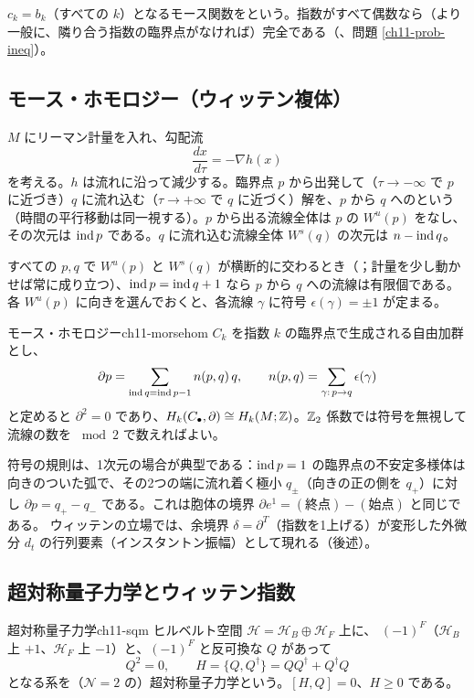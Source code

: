 $c_k=b_k$（すべての $k$）となるモース関数をという。指数がすべて偶数なら（より一般に、隣り合う指数の臨界点がなければ）完全である（、問題 \ref{ch11-prob-ineq}）。

\subsection{モース・ホモロジー（ウィッテン複体）}
$M$ にリーマン計量を入れ、勾配流
\[
\frac{dx}{d\tau}=-\nabla h(x)
\]
を考える。$h$ は流れに沿って減少する。臨界点 $p$ から出発して（$\tau\to-\infty$ で $p$ に近づき）$q$ に流れ込む（$\tau\to+\infty$ で $q$ に近づく）解を、$p$ から $q$ へのという（時間の平行移動は同一視する）。$p$ から出る流線全体は $p$ の $W^u(p)$ をなし、その次元は $\operatorname{ind} p$ である。$q$ に流れ込む流線全体 $W^s(q)$ の次元は $n-\operatorname{ind} q$。

すべての $p,q$ で $W^u(p)$ と $W^s(q)$ が横断的に交わるとき（；計量を少し動かせば常に成り立つ）、$\operatorname{ind} p=\operatorname{ind} q+1$ なら $p$ から $q$ への流線は有限個である。各 $W^u(p)$ に向きを選んでおくと、各流線 $\gamma$ に符号 $\epsilon(\gamma)=\pm1$ が定まる。

\begin{mythm}{モース・ホモロジー}{ch11-morsehom}
$C_k$ を指数 $k$ の臨界点で生成される自由加群とし、
\[
\partial p=\sum_{\operatorname{ind} q=\operatorname{ind} p-1}n(p,q)\,q,\qquad n(p,q)=\sum_{\gamma:\,p\to q}\epsilon(\gamma)
\]
と定めると $\partial^2=0$ であり、$H_k(C_\bullet,\partial)\cong H_k(M;\mathbb{Z})$。$\mathbb{Z}_2$ 係数では符号を無視して流線の数を $\bmod 2$ で数えればよい。
\end{mythm}
符号の規則は、1次元の場合が典型である：$\operatorname{ind} p=1$ の臨界点の不安定多様体は向きのついた弧で、その2つの端に流れ着く極小 $q_\pm$（向きの正の側を $q_+$）に対し $\partial p=q_+-q_-$ である。これは胞体の境界 $\partial e^1=(\text{終点})-(\text{始点})$ と同じである。
ウィッテンの立場では、余境界 $\delta=\partial^T$（指数を1上げる）が変形した外微分 $d_t$ の行列要素（インスタントン振幅）として現れる（後述）。

\subsection{超対称量子力学とウィッテン指数}

\begin{mydef}{超対称量子力学}{ch11-sqm}
ヒルベルト空間 $\mathcal{H}=\mathcal{H}_B\oplus\mathcal{H}_F$ 上に、 $(-1)^F$（$\mathcal H_B$ 上 $+1$、$\mathcal H_F$ 上 $-1$）と、$(-1)^F$ と反可換な $Q$ があって
\[
Q^2=0,\qquad H=\{Q,Q^\dagger\}=QQ^\dagger+Q^\dagger Q
\]
となる系を（$\mathcal N=2$ の）超対称量子力学という。$[H,Q]=0$、$H\ge0$ である。
\end{mydef}

